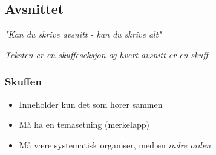 \subsection*{Avsnittet}

\textit{"Kan du skrive avsnitt - kan du skrive alt"} 

\textit{Teksten er en skuffeseksjon og hvert avsnitt er en skuff}

\subsubsection*{Skuffen}

\begin{itemize}
    \item Inneholder kun det som hører sammen
    \item Må ha en temasetning (merkelapp)
    \item Må være systematisk organiser, med en \textit{indre orden}
\end{itemize}
